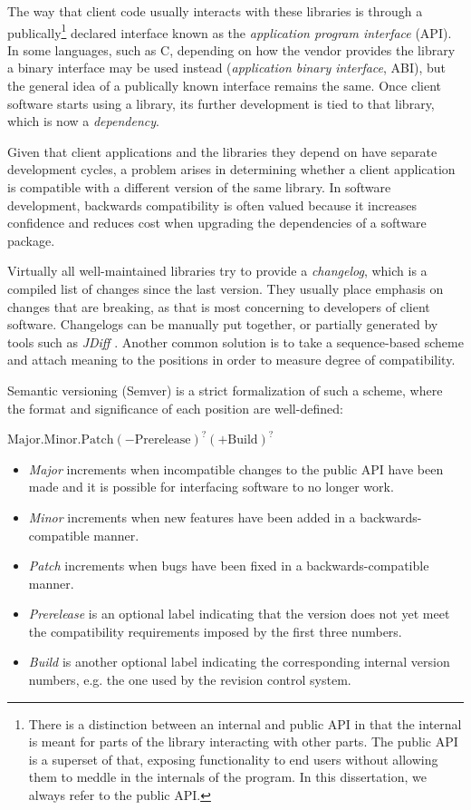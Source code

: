 \documentclass{l4proj}
\begin{document}
The way that client code usually interacts with these libraries is
through a publically\footnote{There is a distinction between an
internal and public API in that the internal is meant for parts of the
library interacting with other parts. The public API is a superset of
that, exposing functionality to end users without allowing them to
meddle in the internals of the program. In this dissertation, we
always refer to the public API.} declared interface known as the
\textit{application program interface} (API). In some languages, such
as C, depending on how the vendor provides the library a binary
interface may be used instead (\textit{application binary interface},
ABI), but the general idea of a publically known interface remains the
same. Once client software starts using a library, its further
development is tied to that library, which is now a
\textit{dependency}.

Given that client applications and the libraries they depend on have
separate development cycles, a problem arises in determining whether a
client application is compatible with a different version of the same
library. In software development, backwards compatibility is often
valued because it increases confidence and reduces cost when upgrading
the dependencies of a software package.

Virtually all well-maintained libraries try to provide a \textit{changelog},
which is a compiled list of changes since the last version. They usually
place emphasis on changes that are breaking, as that is most
concerning to developers of client software. Changelogs can be
manually put together, or partially generated by tools such as
\textit{JDiff} \cite{JDiff}. Another common solution is to take a
sequence-based scheme and attach meaning to the positions in order to
measure degree of compatibility.

Semantic versioning \cite{SemanticVersioning} (Semver) is a strict
formalization of such a scheme, where the format and significance of
each position are well-defined:

\begin{center}
$\mathrm{Major.Minor.Patch}(-\mathrm{Prerelease})^?(+\mathrm{Build})^?$
\end{center}

\begin{itemize}
\item \textit{Major} increments when incompatible changes to the
public API have been made and it is possible for interfacing software
to no longer work.
\item \textit{Minor} increments when new features have been added in a
backwards-compatible manner.
\item \textit{Patch} increments when bugs have been fixed in a
backwards-compatible manner.
\item \textit{Prerelease} is an optional label indicating that the
version does not yet meet the compatibility requirements imposed by
the first three numbers.
\item \textit{Build} is another optional label indicating the
corresponding internal version numbers, e.g. the one used by the
revision control system.
\end{itemize}
\end{document}
